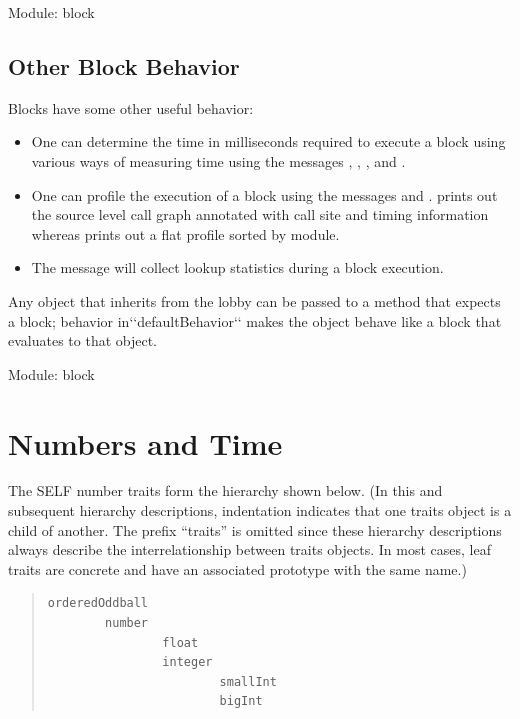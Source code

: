 \documentclass[letterpaper,10pt,english]{sphinxmanual}
\begin{document}
Module: block


\subsection{Other Block Behavior}
\label{blocks:other-block-behavior}
Blocks have some other useful behavior:
\begin{itemize}
\item {} 
One can determine the time in milliseconds required to execute a block using various ways of measuring time using the messages , , , and .

\item {} 
One can profile the execution of a block using the messages  and .  prints out the source level call graph annotated with call site and timing information       whereas  prints out a flat profile sorted by module.

\item {} 
The message  will collect lookup statistics during a block execution.

\end{itemize}

Any object that inherits from the lobby can be passed to a method that expects a block; behavior in{}`{}`defaultBehavior{}`{}` makes the object behave like a block that evaluates to that object.

Module: block


\section{Numbers and Time}
\label{numbers:numbers-and-time}\label{numbers::doc}
The SELF number traits form the hierarchy shown below. (In this and subsequent hierarchy descriptions,
indentation indicates that one traits object is a child of another. The prefix “traits” is
omitted since these hierarchy descriptions always describe the interrelationship between traits objects.
In most cases, leaf traits are concrete and have an associated prototype with the same name.)
\begin{quote}

\begin{Verbatim}[commandchars=\\\{\}]
orderedOddball
        number
                float
                integer
                        smallInt
                        bigInt
\end{Verbatim}
\end{quote}
\end{document}

